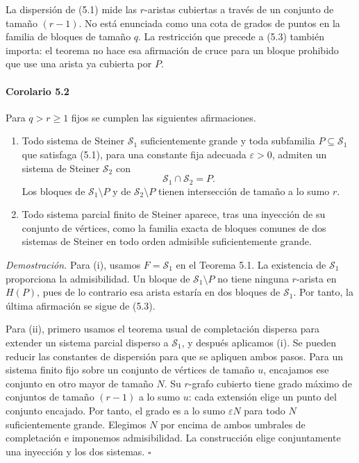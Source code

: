 \documentclass[spanish,11pt,a4paper]{article}
\begin{document}
La dispersión de (5.1) mide las \(r\)-aristas cubiertas a través de un conjunto de tamaño \((r-1)\). No está enunciada como una cota de grados de puntos en la familia de bloques de tamaño \(q\). La restricción que precede a (5.3) también importa: el teorema no hace esa afirmación de cruce para un bloque prohibido que use una arista ya cubierta por \(P\).

\par
\begin{samepage}
\paragraph{Corolario 5.2}\label{corolario-5.2}

Para \(q>r\ge1\) fijos se cumplen las siguientes afirmaciones.

\begin{enumerate}
\def\labelenumi{(\roman{enumi})}
\item
  Todo sistema de Steiner \(\mathcal S_1\) suficientemente grande y toda subfamilia \(P\subseteq\mathcal S_1\) que satisfaga (5.1), para una constante fija adecuada \(\varepsilon>0\), admiten un sistema de Steiner \(\mathcal S_2\) con \[\mathcal S_1\cap\mathcal S_2=P.
  \tag{5.4}\] Los bloques de \(\mathcal S_1\setminus P\) y de \(\mathcal S_2\setminus P\) tienen intersección de tamaño a lo sumo \(r\).
\item
  Todo sistema parcial finito de Steiner aparece, tras una inyección de su conjunto de vértices, como la familia exacta de bloques comunes de dos sistemas de Steiner en todo orden admisible suficientemente grande.
\end{enumerate}

\end{samepage}
\emph{Demostración.} Para (i), usamos \(F=\mathcal S_1\) en el Teorema 5.1. La existencia de \(\mathcal S_1\) proporciona la admisibilidad. Un bloque de \(\mathcal S_1\setminus P\) no tiene ninguna \(r\)-arista en \(H(P)\), pues de lo contrario esa arista estaría en dos bloques de \(\mathcal S_1\). Por tanto, la última afirmación se sigue de (5.3).

Para (ii), primero usamos el teorema usual de completación dispersa para extender un sistema parcial disperso a \(\mathcal S_1\), y después aplicamos (i). Se pueden reducir las constantes de dispersión para que se apliquen ambos pasos. Para un sistema finito fijo sobre un conjunto de vértices de tamaño \(u\), encajamos ese conjunto en otro mayor de tamaño \(N\). Su \(r\)-grafo cubierto tiene grado máximo de conjuntos de tamaño \((r-1)\) a lo sumo \(u\): cada extensión elige un punto del conjunto encajado. Por tanto, el grado es a lo sumo \(\varepsilon N\) para todo \(N\) suficientemente grande. Elegimos \(N\) por encima de ambos umbrales de completación e imponemos admisibilidad. La construcción elige conjuntamente una inyección y los dos sistemas. \(\square\)
\end{document}
